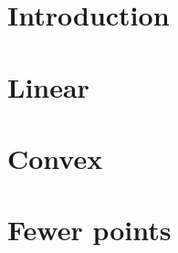 \documentclass{report}
\begin{document}
\tableofcontents

\newpage
\setcounter{page}{1}

\chapter{Introduction}



\chapter{Linear}






\chapter{Convex}







\chapter{Fewer points}






\appendix





\end{document}
